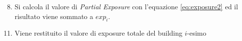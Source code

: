 \begin{enumerate}
	\setcounter{enumi}{7}
	\item Si calcola il valore di \textit{Partial Exposure} con l'equazione \ref{eq:exposure2} ed il risultato viene sommato a $exp_i$. 
\end{enumerate}
\begin{enumerate}
	\setcounter{enumi}{10}
	\item Viene restituito il valore di exposure totale del building $i$-esimo
\end{enumerate}
